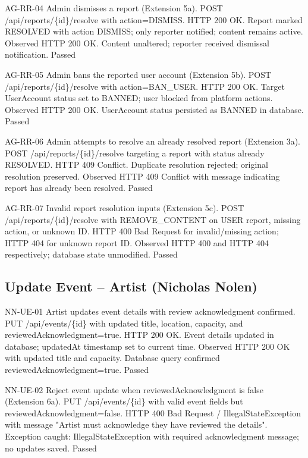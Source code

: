 \documentclass[11pt]{report}
\begin{document}
\alextestcase
{AG-RR-04}
{Admin dismisses a report (Extension 5a).}
{POST /api/reports/\{id\}/resolve with action=DISMISS.}
{HTTP 200 OK. Report marked RESOLVED with action DISMISS; only reporter notified; content remains active.}
{Observed HTTP 200 OK. Content unaltered; reporter received dismissal notification.}
{Passed}

\clearpage
\alextestcase
{AG-RR-05}
{Admin bans the reported user account (Extension 5b).}
{POST /api/reports/\{id\}/resolve with action=BAN\_USER.}
{HTTP 200 OK. Target UserAccount status set to BANNED; user blocked from platform actions.}
{Observed HTTP 200 OK. UserAccount status persisted as BANNED in database.}
{Passed}

\alextestcase
{AG-RR-06}
{Admin attempts to resolve an already resolved report (Extension 3a).}
{POST /api/reports/\{id\}/resolve targeting a report with status already RESOLVED.}
{HTTP 409 Conflict. Duplicate resolution rejected; original resolution preserved.}
{Observed HTTP 409 Conflict with message indicating report has already been resolved.}
{Passed}

\clearpage
\alextestcase
{AG-RR-07}
{Invalid report resolution inputs (Extension 5c).}
{POST /api/reports/\{id\}/resolve with REMOVE\_CONTENT on USER report, missing action, or unknown ID.}
{HTTP 400 Bad Request for invalid/missing action; HTTP 404 for unknown report ID.}
{Observed HTTP 400 and HTTP 404 respectively; database state unmodified.}
{Passed}

\clearpage
\subsection*{Update Event -- Artist (Nicholas Nolen)}
\nicktestcase
{NN-UE-01}
{Artist updates event details with review acknowledgment confirmed.}
{PUT /api/events/\{id\} with updated title, location, capacity, and reviewedAcknowledgment=true.}
{HTTP 200 OK. Event details updated in database; updatedAt timestamp set to current time.}
{Observed HTTP 200 OK with updated title and capacity. Database query confirmed reviewedAcknowledgment=true.}
{Passed}

\nicktestcase
{NN-UE-02}
{Reject event update when reviewedAcknowledgment is false (Extension 6a).}
{PUT /api/events/\{id\} with valid event fields but reviewedAcknowledgment=false.}
{HTTP 400 Bad Request / IllegalStateException with message "Artist must acknowledge they have reviewed the details".}
{Exception caught: IllegalStateException with required acknowledgment message; no updates saved.}
{Passed}
\end{document}
